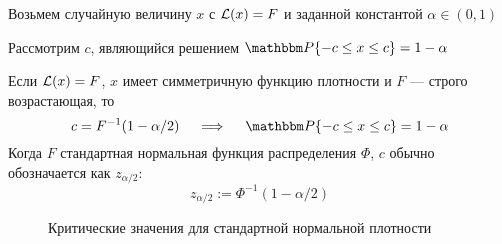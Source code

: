 \begin{frame}

    \vspace{2em}
    Возьмем случайную величину $x$ с $\mathcal L(x) = F$ и заданной константой $\alpha \in
    (0,1)$ 
    
    \vspace{.7em}
    Рассмотрим $c$, являющийся решением $\PP\{-c \leq x \leq c \}  = 1 - \alpha$
    
    \Fact
        Если $\mathcal L(x) = F$, $x$ имеет симметричную функцию плотности и $F$ --- строго возрастающая, то
        \begin{equation}
            \label{eq:symcdf}
            c = F^{-1}(1 - \alpha/2) 
            \quad \implies \quad
            \PP\{-c \leq x \leq c\} = 1 - \alpha
        \end{equation}
    Когда $F$ стандартная нормальная функция распределения $\Phi$, $c$ 
    обычно обозначается как $z_{\alpha/2}$:
    \begin{equation}
        \label{eq:zalpha2}
        z_{\alpha/2} := \Phi^{-1}(1 - \alpha/2)
    \end{equation}
    
\end{frame}

\begin{frame}

    \begin{figure}
   \begin{center}
    \caption{\label{f:fcca} Критические значения для стандартной нормальной плотности}
   \end{center}
    \end{figure}

\end{frame}



